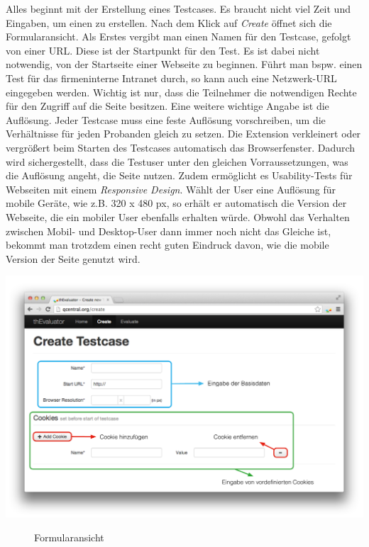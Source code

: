 Alles beginnt mit der Erstellung eines Testcases. Es braucht nicht viel Zeit und Eingaben, um einen zu erstellen. Nach dem Klick auf \textit{Create} öffnet sich die Formularansicht. Als Erstes vergibt man einen Namen für den Testcase, gefolgt von einer URL. Diese ist der Startpunkt für den Test. Es ist dabei nicht notwendig, von der Startseite einer Webseite zu beginnen. Führt man bspw. einen Test für das firmeninterne Intranet durch, so kann auch eine Netzwerk-URL eingegeben werden. Wichtig ist nur, dass die Teilnehmer die notwendigen Rechte für den Zugriff auf die Seite besitzen. Eine weitere wichtige Angabe ist die Auflösung. Jeder Testcase muss eine feste Auflösung vorschreiben, um die Verhältnisse für jeden Probanden gleich zu setzen. Die Extension verkleinert oder vergrößert beim Starten des Testcases automatisch das Browserfenster. Dadurch wird sichergestellt, dass die Testuser unter den gleichen Vorraussetzungen, was die Auflösung angeht, die Seite nutzen. Zudem ermöglicht es Usability-Tests für Webseiten mit einem \textit{Responsive Design}. Wählt der User eine Auflösung für mobile Geräte, wie z.B. 320 x 480 px, so erhält er automatisch die Version der Webseite, die ein mobiler User ebenfalls erhalten würde. Obwohl das Verhalten zwischen Mobil- und Desktop-User dann immer noch nicht das Gleiche ist, bekommt man trotzdem einen recht guten Eindruck davon, wie die mobile Version der Seite genutzt wird.

\begin{center}
\includegraphics[scale=0.40]{./images/createscreen}
\end{center}
\begin{figure}[htb]
   \centering
   \caption{Formularansicht}
    \label{createview}
\end{figure}

